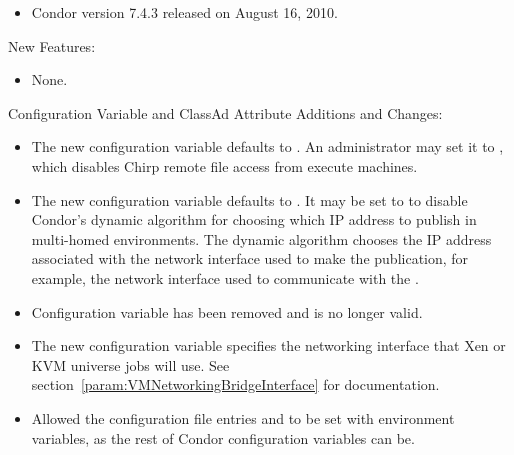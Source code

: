 \begin{itemize}

\item Condor version 7.4.3 released on August 16, 2010.

\end{itemize}


\noindent New Features:

\begin{itemize}

\item None.

\end{itemize}

\noindent Configuration Variable and ClassAd Attribute Additions and Changes:

\begin{itemize}

\item The new configuration variable  
defaults to . 
An administrator may set it to , which 
disables Chirp remote file access from execute machines.

\item The new configuration variable
   defaults to .  It may
  be set to  to disable Condor's dynamic algorithm for choosing
  which IP address to publish in multi-homed environments.  The dynamic
  algorithm chooses the IP address associated with the network interface
  used to make the publication, for example, the network interface used 
  to communicate with the .

\item Configuration variable  has been removed
  and is no longer valid.

\item The new configuration variable
   specifies the networking interface
  that Xen or KVM  universe jobs will use.
  See section~\ref{param:VMNetworkingBridgeInterface} for documentation.

\item
Allowed the configuration file entries 
and  to be set with environment variables,
as the rest of Condor configuration variables can be.

\end{itemize}

